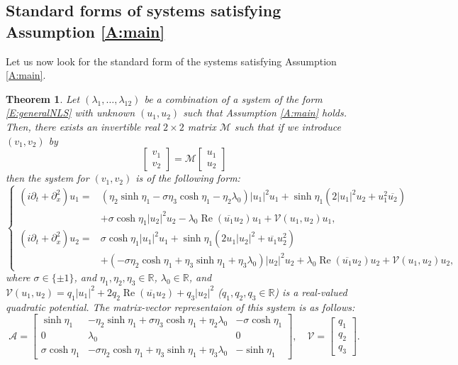 \documentclass[11pt,a4paper,oneside]{amsart}
\theoremstyle{plain}
\newtheorem{theorem}{Theorem}[section]
\theoremstyle{remark}
\numberwithin{equation}{section}
\newcommand{\R}{\mathbb{R}}
\renewcommand{\Re}{\operatorname{Re}}
\theoremstyle{definition}
\newcommand{\ol}{\overline}
\begin{document}
\subsection{Standard forms of systems satisfying Assumption \ref{A:main}}

Let us now look for the standard form of the systems satisfying Assumption \ref{A:main}.
\begin{theorem}\label{T:std}
Let $(\lambda_1,\dots,\lambda_{12})$ be a combination of a system of the form \eqref{E:generalNLS} with unknown $(u_1,u_2)$
such that Assumption \ref{A:main} holds. Then, there exists an  invertible real $2\times 2$ matrix $\mathscr{M}$ such that if we introduce $(v_1,v_2)$ by
\[
	\begin{bmatrix} v_1 \\ v_2 \end{bmatrix}
	= \mathscr{M} \begin{bmatrix} u_1 \\ u_2 \end{bmatrix}
\]
then the system for $(v_1,v_2)$ 
is of the following form:
\begin{equation}\label{E:stdNLS}
\left\{
\begin{aligned}
	(i  \partial_t + \partial_x^2 )u_1={}&
(\eta_2 \sinh \eta_1 - \sigma \eta_3\cosh \eta_1 - \eta_2 \lambda_0) |u_1|^2 u_1 +\sinh \eta_1 (2|u_1|^2 u_2 + u_1^2\ol{u_2})\\&+ \sigma \cosh  \eta_1 |u_2|^2u_2
	 - \lambda_0 \Re (\overline{u_1} u_2) u_1 +\mathcal{V}(u_1,u_2) u_1, \\
	(i  \partial_t + \partial_x^2 )u_2={}&
\sigma \cosh \eta_1 |u_1|^2 u_1+ \sinh \eta_1 (2 u_1 |u_2|^2 + \ol{u_1}u_2^2) \\&+ ( -\sigma \eta_2 \cosh \eta_1+\eta_3 \sinh \eta_1 + \eta_3 \lambda_0 ) |u_2|^2u_2
	 + \lambda_0 \Re (\overline{u_1} u_2) u_2 + \mathcal{V}(u_1,u_2)u_2,
\end{aligned}
\right.
\end{equation}
where $\sigma\in\{\pm1\}$, and $\eta_1,\eta_2,\eta_3 \in \R$, $\lambda_0\in \R$,
and
$\mathcal{V}(u_1,u_2)=q_1 |u_1|^2 + 2q_2 \Re (\overline{u_1}u_2)  + q_3 |u_2|^2$ 
($q_1,q_2,q_3 \in \R$)
is a real-valued quadratic potential.
The matrix-vector representaion of this system is as follows:
\begin{equation}\label{E:stdAV}
	\mathscr{A}= \begin{bmatrix}
	\sinh \eta_1 & -\eta_2 \sinh \eta_1 + \sigma\eta_3\cosh \eta_1 + \eta_2 \lambda_0 & -\sigma \cosh \eta_1 \\
	0 & \lambda_0 & 0 \\
	\sigma \cosh  \eta_1& -\sigma \eta_2 \cosh \eta_1+\eta_3 \sinh \eta_1 + \eta_3 \lambda_0 & - \sinh \eta_1
	\end{bmatrix}, \quad
	\mathscr{V}= \begin{bmatrix}
	q_1 \\ q_2 \\ q_3
	\end{bmatrix}.
\end{equation}
\end{theorem}
\end{document}

